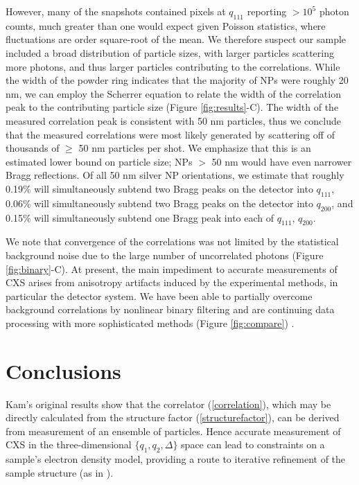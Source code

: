 \documentclass [11pt,fleqn]{article}
\begin{document}
However, many of the snapshots contained pixels at $q_{111}$ reporting $> 10^5$ photon counts, much greater than one would expect given Poisson statistics, where fluctuations are order square-root of the mean. We therefore suspect our sample included a broad distribution of particle sizes, with larger particles scattering more photons, and thus larger particles contributing to the correlations. While the width of the powder ring indicates that the majority of NPs were roughly 20 nm, we can employ the Scherrer equation to relate the width of the correlation peak to the contributing particle size (Figure \ref{fig:results}-C). The width of the measured correlation peak is consistent with 50 nm particles, thus we conclude that the measured correlations were most likely generated by scattering off of thousands of $\ge$ 50 nm particles per shot. We emphasize that this is an estimated lower bound on particle size;  NPs $>$ 50 nm would have even narrower Bragg reflections. Of all 50 nm silver NP orientations, we estimate that roughly 0.19\% will simultaneously subtend two Bragg peaks on the detector into $q_{111}$, 0.06\% will simultaneously subtend two Bragg peaks on the detector into $q_{200}$, and 0.15\% will simultaneously subtend one Bragg peak into each of $q_{111}$, $q_{200}$.

We note that convergence of the correlations was not limited by the statistical background noise due to the large number of uncorrelated photons (Figure \ref{fig:binary}-C). At present, the main impediment to accurate measurements of CXS arises from anisotropy artifacts induced by the experimental methods, in particular the detector system.  We have been able to partially overcome background correlations by nonlinear binary filtering and are continuing data processing with more sophisticated methods (Figure \ref{fig:compare}) .

\section{Conclusions}

Kam's original results \cite{Kam:1977wc} show that the correlator (\ref{correlation}), which may be directly calculated from the structure factor (\ref{structurefactor}), can be derived from measurement of an ensemble of particles. Hence accurate measurement of CXS in the three-dimensional $\{q_1,q_2,\Delta\}$ space can lead to constraints on a sample's electron density model, providing a route to iterative refinement of the sample structure (as in \cite{Schroder:2010cm}).
\end{document}
